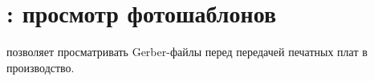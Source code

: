 \section{: просмотр фотошаблонов}

позволяет просматривать Gerber-файлы перед передачей печатных плат в
производство.
